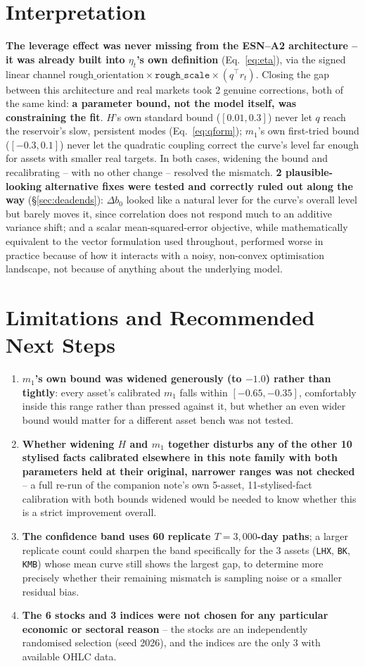 \documentclass[11pt]{article}
\begin{document}
\section{Interpretation}
\textbf{The leverage effect was never missing from the ESN--A2 architecture
-- it was already built into $\eta_t$'s own definition} (Eq.~\ref{eq:eta}),
via the signed linear channel $\text{rough\_orientation}\times
\texttt{rough\_scale}\times(q^\top r_t)$. Closing the gap between this
architecture and real markets took 2 genuine corrections, both of the same
kind: \textbf{a parameter bound, not the model itself, was constraining the
fit}. $H$'s own standard bound ($[0.01,0.3]$) never let $q$ reach the
reservoir's slow, persistent modes (Eq.~\ref{eq:qform}); $m_1$'s own
first-tried bound ($[-0.3,0.1]$) never let the quadratic coupling correct
the curve's level far enough for assets with smaller real targets. In both
cases, widening the bound and recalibrating -- with no other change --
resolved the mismatch. \textbf{2 plausible-looking alternative fixes were
tested and correctly ruled out along the way} (\S\ref{sec:deadends}):
$\Delta b_0$ looked like a natural lever for the curve's overall level but
barely moves it, since correlation does not respond much to an additive
variance shift; and a scalar mean-squared-error objective, while
mathematically equivalent to the vector formulation used throughout,
performed worse in practice because of how it interacts with a noisy,
non-convex optimisation landscape, not because of anything about the
underlying model.

\section{Limitations and Recommended Next Steps}
\begin{enumerate}
\item \textbf{$m_1$'s own bound was widened generously (to $-1.0$) rather
than tightly}: every asset's calibrated $m_1$ falls within $[-0.65,-0.35]$,
comfortably inside this range rather than pressed against it, but whether an
even wider bound would matter for a different asset bench was not tested.
\item \textbf{Whether widening $H$ and $m_1$ together disturbs any of the
other 10 stylised facts calibrated elsewhere in this note family with both
parameters held at their original, narrower ranges was not checked} -- a
full re-run of the companion note's own 5-asset, 11-stylised-fact
calibration with both bounds widened would be needed to know whether this is
a strict improvement overall.
\item \textbf{The confidence band uses 60 replicate $T=3{,}000$-day paths};
a larger replicate count could sharpen the band specifically for the 3
assets (\texttt{LHX}, \texttt{BK}, \texttt{KMB}) whose mean curve still
shows the largest gap, to determine more precisely whether their remaining
mismatch is sampling noise or a smaller residual bias.
\item \textbf{The 6 stocks and 3 indices were not chosen for any particular
economic or sectoral reason} -- the stocks are an independently randomised
selection (seed 2026), and the indices are the only 3 with available OHLC
data.
\end{enumerate}
\end{document}
